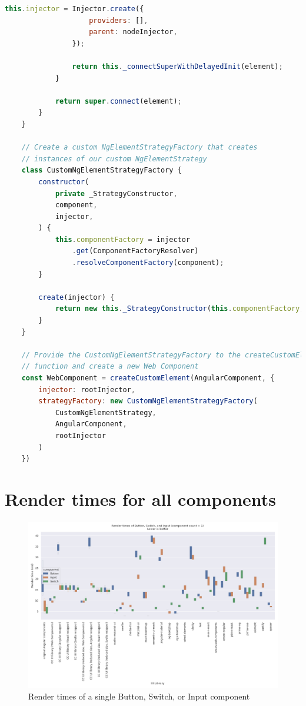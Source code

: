 \begin{lstlisting}[language={JavaScript},caption={The code for creating a Hierarchical Injector in an Angular Elements component},label={lst:appendix:hierarchical-injectors}]
				this.injector = Injector.create({
					providers: [],
					parent: nodeInjector,
				});
	
				return this._connectSuperWithDelayedInit(element);
			}
	
			return super.connect(element);
		}
	}
	
	// Create a custom NgElementStrategyFactory that creates
	// instances of our custom NgElementStrategy
	class CustomNgElementStrategyFactory {
		constructor(
			private _StrategyConstructor,
			component,
			injector,
		) {
			this.componentFactory = injector
				.get(ComponentFactoryResolver)
				.resolveComponentFactory(component);
		}
	
		create(injector) {
			return new this._StrategyConstructor(this.componentFactory, injector);
		}
	}
	
	// Provide the CustomNgElementStrategyFactory to the createCustomElement
	// function and create a new Web Component
	const WebComponent = createCustomElement(AngularComponent, {
		injector: rootInjector,
		strategyFactory: new CustomNgElementStrategyFactory(
			CustomNgElementStrategy,
			AngularComponent,
			rootInjector
		)
	})
		\end{lstlisting}

	\section{Render times for all components}

	\begin{figure}[h]
		\includegraphics[width=\columnwidth]{plots/render-time-all-big-1.png}
		\caption{Render times of a single Button, Switch, or Input component}
		\label{fig:appendix:render-time-cow-1}
		\centering
	\end{figure}

